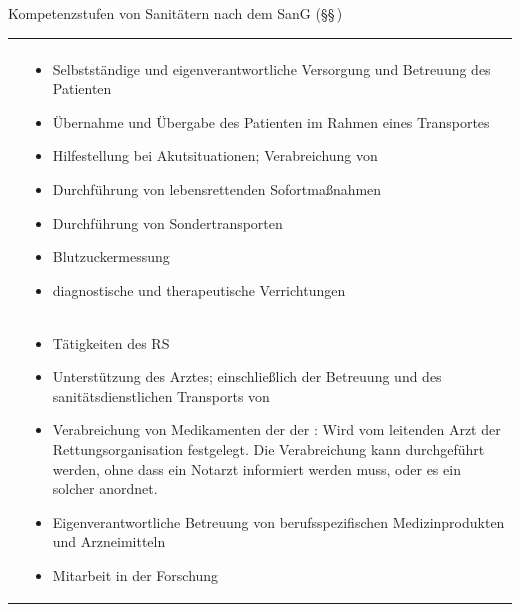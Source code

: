 \TableWide
{Kompetenzstufen von Sanitätern nach dem SanG}%
{({\S}{\S}\,)}%
{\label{tab:sang-kompetenzstufen}}%
{}%
{}%
{%
\begin{tabulary}{\linewidth}{LL}\toprule\addlinespace
\noindent{}
&
\noindent{}
\\\addlinespace\toprule\addlinespace
{}

&
\begin{minipage}[t]{\linewidth}
\begin{itemize}
  \item Selbstständige und eigenverantwortliche Versorgung
  und Betreuung
    des Patienten
    \item Übernahme und Übergabe des Patienten im Rahmen
    eines Transportes
    \item Hilfestellung bei Akutsituationen; Verabreichung von 
    \item Durchführung von lebensrettenden Sofortmaßnahmen
    \item Durchführung von Sondertransporten
    \item Blutzuckermessung
    \item diagnostische und therapeutische Verrichtungen
\end{itemize}
\end{minipage}


\\\addlinespace\toprule\addlinespace
{}

&
\begin{minipage}[t]{\linewidth}
\begin{itemize}
  \item Tätigkeiten des RS
  \item Unterstützung des Arztes; einschließlich der
  Betreuung und des sanitätsdienstlichen Transports von 
  \item Verabreichung von Medikamenten der der
  :
    Wird vom leitenden Arzt der Rettungsorganisation
    festgelegt. Die Verabreichung kann durchgeführt werden,
    ohne dass ein Notarzt informiert werden muss, oder es
    ein solcher anordnet.
    \item Eigenverantwortliche Betreuung von berufsspezifischen
    Medizinprodukten und Arzneimitteln
    \item Mitarbeit in der Forschung
\end{itemize}
\end{minipage}


\end{tabulary}}
